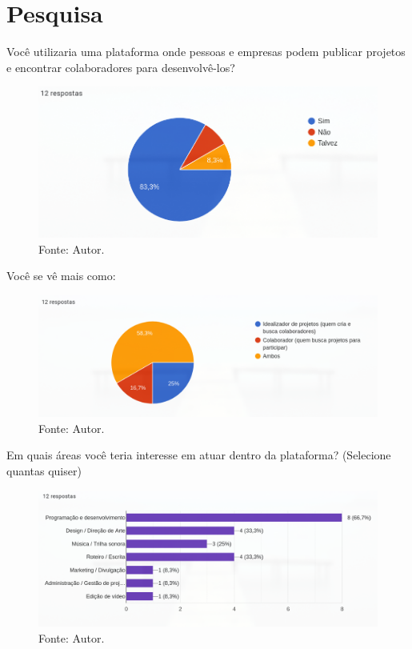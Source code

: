 \section*{Pesquisa}

{\Large
Você utilizaria uma plataforma onde pessoas e empresas podem publicar projetos e encontrar colaboradores para desenvolvê-los?
}

\begin{figure}[H]
    \centering
    \includegraphics[width=0.8\linewidth]{images/graph_1.png}
    \caption{Fonte: Autor.}
    \label{fig:g1}
\end{figure}

{\Large
Você se vê mais como:
}

\begin{figure}[H]
    \centering
    \includegraphics[width=0.8\linewidth]{images/graph_2.png}
    \caption{Fonte: Autor.}
    \label{fig:g2}
\end{figure}

{\Large
Em quais áreas você teria interesse em atuar dentro da plataforma?
(Selecione quantas quiser)  
}

\begin{figure}[H]
    \centering
    \includegraphics[width=0.8\linewidth]{images/graph_3.png}
    \caption{Fonte: Autor.}
    \label{fig:g3}
\end{figure}

